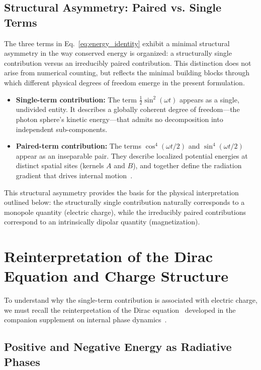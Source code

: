 \documentclass[12pt,letterpaper]{article}
\begin{document}
\subsection{Structural Asymmetry: Paired vs. Single Terms}

The three terms in Eq.~\eqref{eq:energy_identity} exhibit a minimal structural asymmetry in the way conserved energy is organized: a structurally single contribution versus an irreducibly paired contribution. This distinction does not arise from numerical counting, but reflects the minimal building blocks through which different physical degrees of freedom emerge in the present formulation.

\begin{itemize}
\item \textbf{Single-term contribution:} The term $\frac{1}{2}\sin^2(\omega t)$ appears as a single, undivided entity. It describes a globally coherent degree of freedom---the photon sphere's kinetic energy---that admits no decomposition into independent sub-components.

\item \textbf{Paired-term contribution:} The terms $\cos^4(\omega t/2)$ and $\sin^4(\omega t/2)$ appear as an inseparable pair. They describe localized potential energies at distinct spatial sites (kernels $A$ and $B$), and together define the radiation gradient that drives internal motion~\cite{hanamura18356895}.
\end{itemize}

This structural asymmetry provides the basis for the physical interpretation outlined below: the structurally single contribution naturally corresponds to a monopole quantity (electric charge), while the irreducibly paired contributions correspond to an intrinsically dipolar quantity (magnetization).


\section{Reinterpretation of the Dirac Equation and Charge Structure}

To understand why the single-term contribution is associated with electric charge, we must recall the reinterpretation of the Dirac equation~\cite{Dirac1928} developed in the companion supplement on internal phase dynamics~\cite{hanamura17760132}.

\subsection{Positive and Negative Energy as Radiative Phases}
\end{document}
